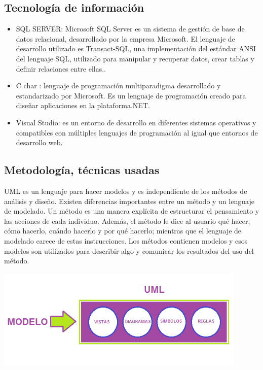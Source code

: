 \documentclass[preprint,12pt]{elsarticle}
\begin{document}
\subsection{\textbf{Tecnología de información  }}
		\begin{itemize}
	\item 	SQL SERVER: Microsoft SQL Server es un sistema de gestión de base de datos relacional, desarrollado por la empresa Microsoft. El lenguaje de desarrollo utilizado es Transact-SQL, una implementación del estándar ANSI del lenguaje SQL, utilizado para manipular y recuperar datos, crear tablas y definir relaciones entre ellas..
	\item 	C char : lenguaje de programación multiparadigma desarrollado y estandarizado por Microsoft. Es un lenguaje de programación creado para diseñar aplicaciones en la plataforma.NET.
	\item 	Visual Studio: es un entorno de desarrollo en diferentes sistemas operativos y compatibles con múltiples lenguajes de programación al igual que entornos de desarrollo web. 
	\end{itemize}
\subsection{\textbf{ Metodología, técnicas usadas  }}
UML es un lenguaje para hacer modelos y es independiente de los métodos de análisis y diseño. Existen diferencias importantes entre un método y un lenguaje de modelado. Un método es una manera explícita de estructurar el pensamiento y las acciones de cada individuo. Además, el método le dice al usuario qué hacer, cómo hacerlo, cuándo hacerlo y por qué hacerlo; mientras que el lenguaje de modelado carece de estas instrucciones. Los métodos contienen modelos y esos modelos son utilizados para describir algo y comunicar los resultados del uso del método.
          \begin{center}
	\includegraphics[width=12cm]{./imagen/5} 
	\end{center}
		
\end{document}
